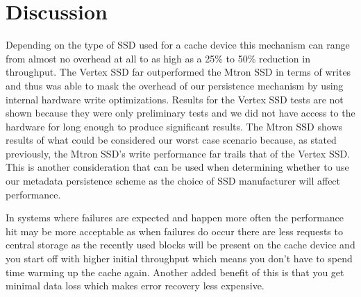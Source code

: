\section{Discussion}
\label{sec:discussion}

Depending on the type of SSD used for a cache device this mechanism
can range from almost no overhead at all to as high as a 25\% to 50\%
reduction in throughput. The Vertex SSD far outperformed the Mtron SSD
in terms of writes and thus was able to mask the overhead of our
persistence mechanism by using internal hardware write
optimizations. Results for the Vertex SSD tests are not shown because
they were only preliminary tests and we did not have access to the
hardware for long enough to produce significant results. The Mtron SSD
shows results of what could be considered our worst case scenario
because, as stated previously, the Mtron SSD's write performance far
trails that of the Vertex SSD. This is another consideration that can
be used when determining whether to use our metadata persistence
scheme as the choice of SSD manufacturer will affect performance.

In systems where failures are expected and happen more often the
performance hit may be more acceptable as when failures do occur there
are less requests to central storage as the recently used blocks will
be present on the cache device and you start off with higher initial
throughput which means you don't have to spend time warming up the
cache again. Another added benefit of this is that you get minimal
data loss which makes error recovery less expensive.
